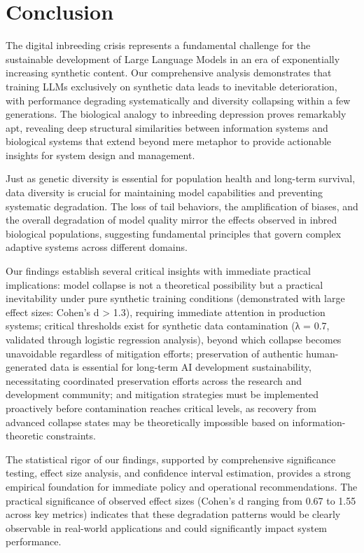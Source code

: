 \documentclass{article}
\begin{document}
\section{Conclusion}

The digital inbreeding crisis represents a fundamental challenge for the sustainable development of Large Language Models in an era of exponentially increasing synthetic content. Our comprehensive analysis demonstrates that training LLMs exclusively on synthetic data leads to inevitable deterioration, with performance degrading systematically and diversity collapsing within a few generations. The biological analogy to inbreeding depression proves remarkably apt, revealing deep structural similarities between information systems and biological systems that extend beyond mere metaphor to provide actionable insights for system design and management.

Just as genetic diversity is essential for population health and long-term survival, data diversity is crucial for maintaining model capabilities and preventing systematic degradation. The loss of tail behaviors, the amplification of biases, and the overall degradation of model quality mirror the effects observed in inbred biological populations, suggesting fundamental principles that govern complex adaptive systems across different domains.

Our findings establish several critical insights with immediate practical implications: model collapse is not a theoretical possibility but a practical inevitability under pure synthetic training conditions (demonstrated with large effect sizes: Cohen's d > 1.3), requiring immediate attention in production systems; critical thresholds exist for synthetic data contamination (λ = 0.7, validated through logistic regression analysis), beyond which collapse becomes unavoidable regardless of mitigation efforts; preservation of authentic human-generated data is essential for long-term AI development sustainability, necessitating coordinated preservation efforts across the research and development community; and mitigation strategies must be implemented proactively before contamination reaches critical levels, as recovery from advanced collapse states may be theoretically impossible based on information-theoretic constraints.

The statistical rigor of our findings, supported by comprehensive significance testing, effect size analysis, and confidence interval estimation, provides a strong empirical foundation for immediate policy and operational recommendations. The practical significance of observed effect sizes (Cohen's d ranging from 0.67 to 1.55 across key metrics) indicates that these degradation patterns would be clearly observable in real-world applications and could significantly impact system performance.
\end{document}
